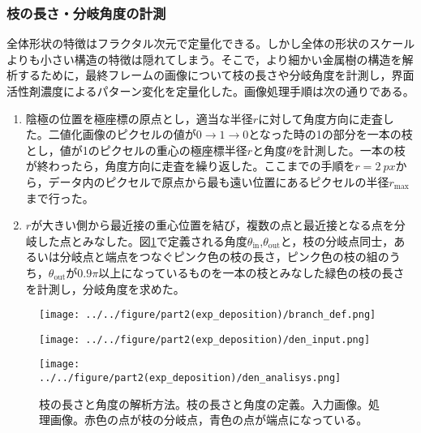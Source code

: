 \documentclass[autodetect-engine,dvi=dvipdfmx,a4paper,ja=standard,oneside,openany,11pt]{bxjsbook}
\begin{document}
\subsubsection{枝の長さ・分岐角度の計測}
全体形状の特徴はフラクタル次元で定量化できる。しかし全体の形状のスケールよりも小さい構造の特徴は隠れてしまう。そこで，より細かい金属樹の構造を解析するために，最終フレームの画像について枝の長さや分岐角度を計測し，界面活性剤濃度によるパターン変化を定量化した。画像処理手順は次の通りである。
\begin{enumerate}
  \item 陰極の位置を極座標の原点とし，適当な半径$r$に対して角度方向に走査した。二値化画像のピクセルの値が$0\rightarrow1\rightarrow0$となった時の1の部分を一本の枝とし，値が1のピクセルの重心の極座標半径$r$と角度$\theta$を計測した。一本の枝が終わったら，角度方向に走査を繰り返した。ここまでの手順を$r=\SI{2}{px}$から，データ内のピクセルで原点から最も遠い位置にあるピクセルの半径$r_{\mathrm{max}}$まで行った。
  \item $r$が大きい側から最近接の重心位置を結び，複数の点と最近接となる点を分岐した点とみなした。図\ref{fig:branch_def_input}で定義される角度$\theta_{\mathrm{in}}$,$\theta_{\mathrm{out}}$と，枝の分岐点同士，あるいは分岐点と端点をつなぐピンク色の枝の長さ，ピンク色の枝の組のうち，$\theta_{\mathrm{out}}$が$0.9\pi$以上になっているものを一本の枝とみなした緑色の枝の長さを計測し，分岐角度を求めた。
\end{enumerate}

\begin{figure}
  \begin{minipage}
    {0.36\textwidth}
    \subcaption{}
    \centering
    \texttt{[image: ../../figure/part2(exp\_deposition)/branch\_def.png]}
    \label{fig:branch_def}
  \end{minipage}
  \begin{minipage}
    {0.31\textwidth}
    \subcaption{}
    \centering
    \texttt{[image: ../../figure/part2(exp\_deposition)/den\_input.png]}
    \label{fig:den_input}
  \end{minipage}
  \begin{minipage}
    {0.31\textwidth}
    \subcaption{}
    \centering
    \texttt{[image: ../../figure/part2(exp\_deposition)/den\_analisys.png]}
    \label{fig:den_analisys}
  \end{minipage}
  \caption{枝の長さと角度の解析方法。枝の長さと角度の定義。入力画像。処理画像。赤色の点が枝の分岐点，青色の点が端点になっている。}
  \label{fig:branch_def_input}
\end{figure}
\end{document}
